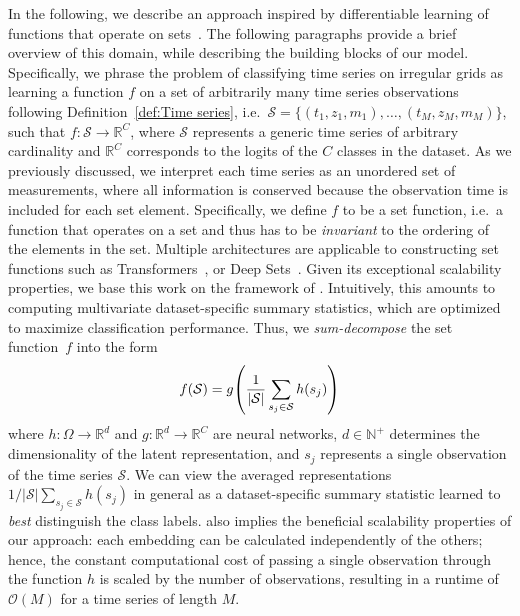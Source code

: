 \documentclass{article}
\renewcommand{\natural}{\mathds{N}\xspace}
\newcommand{\real}     {\mathds{R}\xspace}
\begin{document}
In the following, we describe an approach inspired by differentiable learning of
functions that operate on sets~\citep{zaheer2017deep, Wagstaff2019}. The
following paragraphs provide a brief overview of this domain, while
describing the building blocks of our model.
Specifically, we  phrase the problem of classifying time series on irregular grids as learning
a function $f$ on a set of arbitrarily many time series observations following
Definition~\ref{def:Time series}, i.e.\
$\mathcal{S} = \{(t_{1}, z_{1}, m_{1}), \dots, (t_{M}, z_{M}, m_{M})\}$,
such that
$f\colon \mathcal{S} \to \real^C$,
where $\mathcal{S}$ represents a generic time series of arbitrary
cardinality and $\mathbb{R}^C$ corresponds to the logits of the $C$
classes in the dataset.
As we previously discussed, we interpret each time series as an unordered set of
measurements, where all information is conserved because the observation
time is included for each set element. Specifically, we define $f$ to be
a set function, i.e.\ a function that operates on a set and thus has to be
\emph{invariant} to the ordering of the elements in the set.
Multiple architectures are applicable to constructing set functions such as
Transformers~\citep{lee2019set, vaswani2017attention}, or Deep
Sets~\citep{zaheer2017deep}. Given its exceptional scalability
properties, we base this work on the framework of
\citet{zaheer2017deep}. Intuitively, this amounts to computing
multivariate dataset-specific summary statistics, which are optimized to
maximize classification performance. Thus, we \emph{sum-decompose} the
set function~$f$ into the form
\begin{equation}
    f(\mathcal{S})
        = g\mleft(\frac{1}{|\mathcal{S}|} \sum_{s_j \in \mathcal{S}} h\mleft(s_j\mright) \mright)
    \label{eq:sum-decomposed-set-fn}
\end{equation}
where $h\colon\Omega\to\real^d$ and $g\colon\real^d\to\real^C$ are
neural networks, $d \in \natural^{+}$ determines the
dimensionality of the latent representation, and $s_j$
represents a single observation of the time series $\mathcal{S}$.
We can view the averaged representations $1 / |\mathcal{S}| \sum_{s_j
\in \mathcal{S}} h(s_j)$ in general as a dataset-specific summary
statistic learned to \emph{best} distinguish the class labels.
 also implies the beneficial
scalability properties of our approach: each embedding can be
calculated independently of the others; hence, the constant
computational cost of passing a single observation through the
function $h$ is scaled by the number of observations, resulting in
a runtime of $\mathcal{O}(M)$ for a time series of length $M$.
\end{document}
